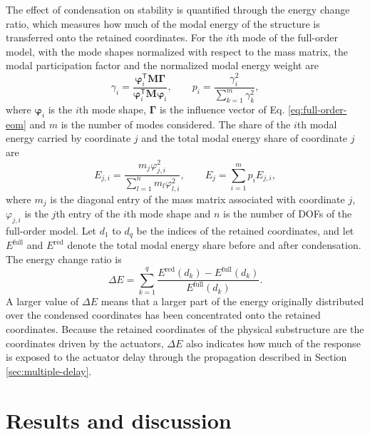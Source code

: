 \documentclass[11pt,a4paper]{article}
\numberwithin{equation}{section}
\begin{document}
The effect of condensation on stability is quantified through the energy change ratio, which measures how much of the modal energy of the structure is transferred onto the retained coordinates. For the \(i\)th mode of the full-order model, with the mode shapes normalized with respect to the mass matrix, the modal participation factor and the normalized modal energy weight are
\begin{equation}
	\gamma_{i}=
	\frac{\bm{\varphi}_{i}^{\mathsf{T}}\mathbf{M}\bm{\Gamma}}
	{\bm{\varphi}_{i}^{\mathsf{T}}\mathbf{M}\bm{\varphi}_{i}},
	\qquad
	p_{i}=\frac{\gamma_{i}^{2}}{\displaystyle\sum_{k=1}^{m}\gamma_{k}^{2}},
	\label{eq:modal-weight}
\end{equation}
where \(\bm{\varphi}_{i}\) is the \(i\)th mode shape, \(\bm{\Gamma}\) is the influence vector of Eq. \eqref{eq:full-order-eom} and \(m\) is the number of modes considered. The share of the \(i\)th modal energy carried by coordinate \(j\) and the total modal energy share of coordinate \(j\) are
\begin{equation}
	E_{j,i}=
	\frac{m_{j}\varphi_{j,i}^{2}}{\displaystyle\sum_{l=1}^{n}m_{l}\varphi_{l,i}^{2}},
	\qquad
	E_{j}=\sum_{i=1}^{m}p_{i}E_{j,i},
	\label{eq:dof-energy}
\end{equation}
where \(m_{j}\) is the diagonal entry of the mass matrix associated with coordinate \(j\), \(\varphi_{j,i}\) is the \(j\)th entry of the \(i\)th mode shape and \(n\) is the number of DOFs of the full-order model. Let \(d_{1}\) to \(d_{q}\) be the indices of the retained coordinates, and let \(E^{\mathrm{full}}\) and \(E^{\mathrm{red}}\) denote the total modal energy share before and after condensation. The energy change ratio is
\begin{equation}
	\Delta E=\sum_{k=1}^{q}
	\frac{E^{\mathrm{red}}(d_{k})-E^{\mathrm{full}}(d_{k})}{E^{\mathrm{full}}(d_{k})}.
	\label{eq:energy-change}
\end{equation}
A larger value of \(\Delta E\) means that a larger part of the energy originally distributed over the condensed coordinates has been concentrated onto the retained coordinates. Because the retained coordinates of the physical substructure are the coordinates driven by the actuators, \(\Delta E\) also indicates how much of the response is exposed to the actuator delay through the propagation described in Section \ref{sec:multiple-delay}.





\section{Results and discussion} \label{sec5}
\end{document}
